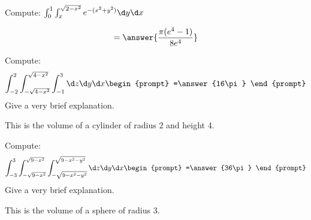 \documentclass{ximera}
\begin{document}
\begin{problem}
  Compute:  $\int_0^1\int_x^{\sqrt{2-x^2}} e^{-(x^2+y^2)}\d y \d x$
  \begin{prompt}
    \[
    = \answer{\frac{\pi(e^4-1)}{8e^4}}
    \]
  \end{prompt}
  \vfill
\end{problem}




\begin{problem}
  Compute:
  \[
  \int_{-2}^{2} \int_{-\sqrt{4-x^2}}^{\sqrt{4-x^2}}\int_{-1}^3 \d z\d y \d x
  \begin{prompt}
  =\answer{16\pi}  
  \end{prompt}
  \]
  Give a very brief explanation.
  \begin{feedback}[correct]
    This is the volume of a cylinder of radius $2$ and height $4$.
  \end{feedback}
  \vfill
\end{problem}


\begin{problem}
  Compute:
  \[
  \int_{-3}^{3} \int_{-\sqrt{9-x^2}}^{\sqrt{9-x^2}}\int_{-\sqrt{9-x^2-y^2}}^{\sqrt{9-x^2-y^2}}\d z\d y \d x
  \begin{prompt}
    =\answer{36\pi}
  \end{prompt}
  \]
  Give a very brief explanation.
  \begin{feedback}[correct]
    This is the volume of a sphere of radius $3$.
  \end{feedback}
  \vfill
\end{problem}
\end{document}
